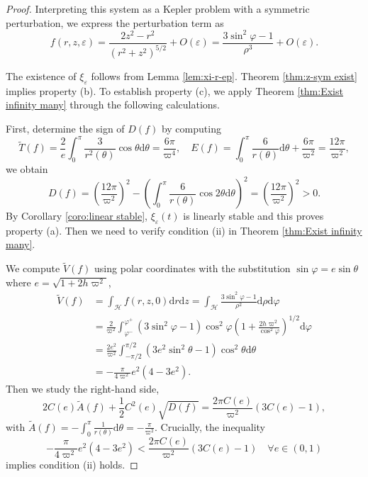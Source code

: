 \documentclass[11pt]{amsart}
\newcommand{\ep}{\varepsilon}
\newcommand{\om}{\varpi}
\begin{document}
\begin{proof} 
	Interpreting this system as a Kepler problem with a symmetric perturbation, we express the perturbation term as
	\begin{equation*}
		f(r,z,\ep)=\frac{2z^{2}-r^{2}}{(r^{2}+z^{2})^{5/2}}+O(\ep)
		=\frac{3\sin^{2}\varphi-1}{\rho^{3}}+O(\ep).
	\end{equation*}

    The existence of $\xi_{\ep}$ follows from Lemma \ref{lem:xi-r-ep}. Theorem \ref{thm:z-sym exist} implies property (b). To establish property (c), we apply Theorem \ref{thm:Exist infinity many} through the following calculations. 
    
    First, determine the sign of $D(f)$ by computing 
    \begin{equation*}
    	\tilde{T}(f) = \frac{2}{e}\int_{0}^{\pi} \frac{3}{r^{2}(\theta)}\cos\theta\mathrm{d}\theta = \frac{6\pi}{\om^{4}},\quad E(f)=\int_{0}^{\pi}\frac{6}{r(\theta)}\mathrm{d}\theta + \frac{6\pi}{\om^{2}}=\frac{12\pi}{\om^{2}},
    \end{equation*}
we obtain 
\begin{equation*}
	D(f) = \left(\frac{12\pi}{\om^{2}}\right)^{2} - \left(\int_{0}^{\pi}\frac{6}{r(\theta)}\cos2\theta\mathrm{d}\theta\right)^{2} 
	= \left(\frac{12\pi}{\om^{2}}\right)^{2} > 0.
\end{equation*}
By Corollary \ref{coro:linear stable}, $\xi_{\ep}(t)$ is linearly stable and this proves property (a). Then we need to verify condition (ii) in Theorem \ref{thm:Exist infinity many}.

    We compute $\tilde{V}(f)$ using polar coordinates with the substitution $\sin\varphi = e\sin\theta$ where $e = \sqrt{1+2h\om^{2}}$,
    \begin{equation}
    	\begin{aligned}
    		\tilde{V}(f) &= \int_{\mathcal{H}}f(r,z,0)\mathrm{d}r\mathrm{d}z 
    		= \int_{\mathcal{H}}\frac{3\sin^{2}\varphi-1}{\rho^{2}}\mathrm{d}\rho\mathrm{d}\varphi \\
    		&= \frac{2}{\om^2}\int_{\varphi^-}^{\varphi^+}(3\sin^2\varphi-1)\cos^2\varphi\left(1+\frac{2h\om^2}{\cos^2\varphi}\right)^{1/2}\mathrm{d}\varphi \\
    		&= \frac{2e^2}{\om^2}\int_{-\pi/2}^{\pi/2}(3e^2\sin^2\theta-1)\cos^2\theta\mathrm{d}\theta \\
    		&= -\frac{\pi}{4\om^{2}}e^{2}(4-3e^{2}).
    	\end{aligned}
    \end{equation}
Then we study the right-hand side,
\begin{equation*}	
	2C(e)\tilde{A}(f) + \frac{1}{2}C^{2}(e)\sqrt{D(f)} 
	= \frac{2\pi C(e)}{\om^{2}}(3C(e)-1),
\end{equation*}
with $\tilde{A}(f) = -\int_{0}^{\pi}\frac{1}{r(\theta)}\mathrm{d}\theta = -\frac{\pi}{\om^{2}}$.
	Crucially, the inequality
	\begin{equation}
		-\frac{\pi}{4\om^{2}}e^{2}(4-3e^{2}) < \frac{2\pi C(e)}{\om^{2}}(3C(e)-1) \quad \forall e\in(0,1)
	\end{equation}
	implies condition (ii) holds.
\end{proof}
\end{document}
